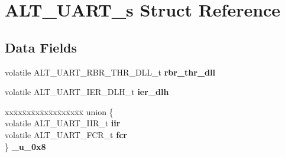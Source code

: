 \hypertarget{structALT__UART__s}{}\section{A\+L\+T\+\_\+\+U\+A\+R\+T\+\_\+s Struct Reference}
\label{structALT__UART__s}
\subsection*{Data Fields}
\begin{DoxyCompactItemize}
\item 
\mbox{\label{structALT__UART__s_a756d0c65c8fb87d1001f242c5ec4e368}} 
volatile A\+L\+T\+\_\+\+U\+A\+R\+T\+\_\+\+R\+B\+R\+\_\+\+T\+H\+R\+\_\+\+D\+L\+L\+\_\+t {\bfseries rbr\+\_\+thr\+\_\+dll}
\item 
\mbox{\label{structALT__UART__s_ac1e6c779e3fb040cdccc16e7ba9ebb2d}} 
volatile A\+L\+T\+\_\+\+U\+A\+R\+T\+\_\+\+I\+E\+R\+\_\+\+D\+L\+H\+\_\+t {\bfseries ier\+\_\+dlh}
\item 
\mbox{\label{structALT__UART__s_a403e31c06aa1990d1f47c973e1787a24}} 
\begin{tabbing}
xx\=xx\=xx\=xx\=xx\=xx\=xx\=xx\=xx\=\kill
union \{\\
\>volatile ALT\_UART\_IIR\_t {\bfseries iir}\\
\>volatile ALT\_UART\_FCR\_t {\bfseries fcr}\\
\} {\bfseries \_u\_0x8}\\


\end{tabbing}
\end{DoxyCompactItemize}

